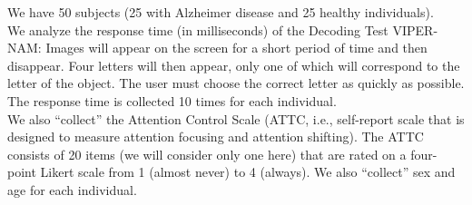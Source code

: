 \documentclass[
]{article}
\begin{document}
We have 50 subjects (25 with Alzheimer disease and 25 healthy
individuals).\\
We analyze the response time (in milliseconds) of the Decoding Test
VIPER-NAM: Images will appear on the screen for a short period of time
and then disappear. Four letters will then appear, only one of which
will correspond to the letter of the object. The user must choose the
correct letter as quickly as possible. The response time is collected 10
times for each individual.\\
We also ``collect'' the Attention Control Scale (ATTC, i.e., self-report
scale that is designed to measure attention focusing and attention
shifting). The ATTC consists of 20 items (we will consider only one
here) that are rated on a four-point Likert scale from 1 (almost never)
to 4 (always). We also ``collect'' sex and age for each individual.
\end{document}
